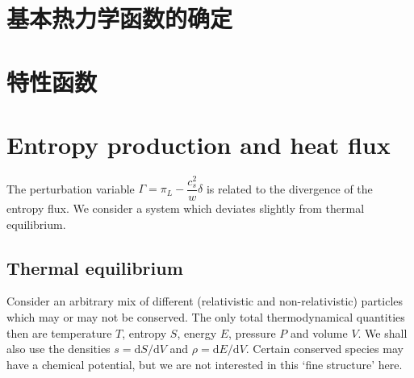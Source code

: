 \documentclass[11pt,a4paper]{article}
\newcommand{\dif}{\mathrm{d}}
\begin{document}
\section{基本热力学函数的确定}












\section{特性函数}











\section{Entropy production and heat flux}
\cite{2008cmb..book.....D}  The perturbation variable $\Gamma = \pi_L - \dfrac{c_s^2}{w} \delta$ is related to the divergence of the entropy flux. We consider a system which deviates slightly from thermal equilibrium.

\subsection{Thermal equilibrium}
Consider an arbitrary mix of different (relativistic and non-relativistic) particles which may or may not be conserved. The only total thermodynamical quantities then are temperature $T$, entropy $S$, energy $E$, pressure $P$ and volume $V$. We shall also use the densities $s = \dif S/\dif V$ and $\rho = \dif E /\dif V$. Certain conserved species may have a chemical potential, but we are not interested in this `fine structure' here. 
\end{document}
